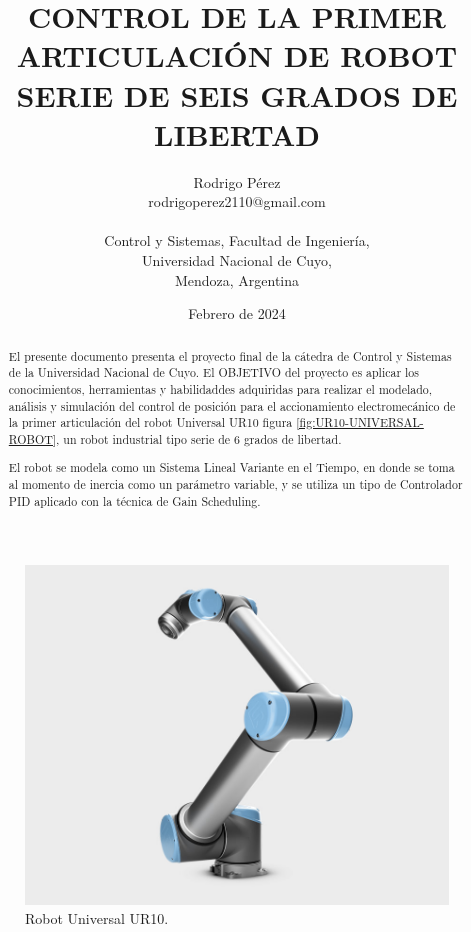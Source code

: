 \documentclass{article}
\title{\textbf{CONTROL DE LA PRIMER ARTICULACIÓN DE ROBOT SERIE DE SEIS GRADOS DE LIBERTAD}}
\author{Rodrigo Pérez \\ rodrigoperez2110@gmail.com \\ \\ Control y Sistemas, Facultad de Ingeniería, \\ Universidad Nacional de Cuyo, \\ Mendoza, Argentina}
\date{Febrero de 2024}
\begin{document}
\begin{sloppypar}

\renewcommand{\tablename}{Tabla}

\maketitle


\begin{figure}[H]
    \centering
    \includegraphics[width=1\textwidth]{UR10-UNIVERSAL-ROBOT}
    \caption{Robot Universal UR10.}
    \label{fig:UR10-UNIVERSAL-ROBOT}
\end{figure}


\begin{abstract}
    El presente documento presenta el proyecto final de la cátedra de Control y Sistemas de la Universidad Nacional de Cuyo.
    El OBJETIVO del proyecto es aplicar los conocimientos, herramientas y habilidaddes adquiridas para realizar el modelado, análisis y simulación del control de posición para el accionamiento electromecánico de la primer articulación del robot Universal UR10 figura \ref{fig:UR10-UNIVERSAL-ROBOT}, un robot industrial tipo serie de 6 grados de libertad.

    El robot se modela como un Sistema Lineal Variante en el Tiempo, en donde se toma al momento de inercia como un parámetro variable, y se utiliza un tipo de Controlador PID aplicado con la técnica de Gain Scheduling.


\end{abstract}
\end{sloppypar}
\end{document}
